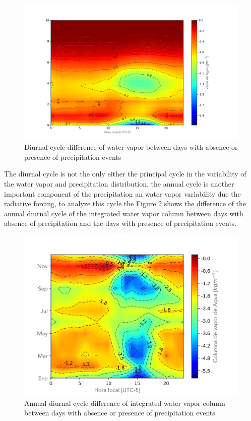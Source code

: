 \documentclass{ametsoc}
\begin{document}
\begin{figure}[h!]
\centering
\includegraphics[width=1.2\linewidth]{Figuras/V_C_Matrix_resta.pdf}
\caption{Diurnal cycle difference of water vapor between days with absence or presence of precipitation events }
\label{fig:VaporDifference}
\end{figure}

The diurnal cycle  is not the only either the principal cycle in the variability of the water vapor and precipitation distribution, the annual cycle is another important component of the precipitation an water vapor variability due the radiative forcing, to analyze this cycle the Figure \ref{fig:VapDifference} shows the difference of the annual diurnal cycle of the integrated water vapor column between days with absence of precipitation and the days with presence of precipitation events.

\begin{figure}[h!]
\centering
\includegraphics[width=1.0\linewidth]{Figuras/Vap_Resta_Matrix.png}
\caption{Annual diurnal cycle difference of integrated water vapor column between days with absence or presence of precipitation events }
\label{fig:VapDifference}
\end{figure}
\end{document}
